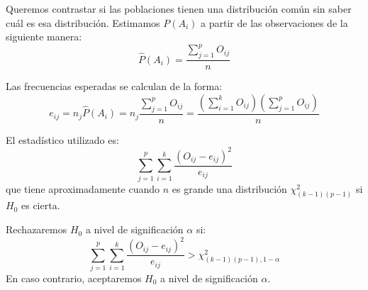 Queremos contrastar si las poblaciones tienen una distribución común sin saber cuál es esa distribución.
Estimamos $P(A_i)$ a partir de las observaciones de la siguiente manera:
$$\hat{P}(A_i) = \frac{\sum_{j=1}^p O_{ij}}{n}$$

Las frecuencias esperadas se calculan de la forma:
$$e_{ij} = n_j\hat{P}(A_i) = n_j \frac{\sum_{j=1}^p O_{ij}}{n} = \frac{(\sum_{i=1}^k O_{ij})(\sum_{j=1}^p O_{ij})}{n}$$

El estadístico utilizado es:
$$\sum_{j=1}^p \sum_{i=1}^k \frac{(O_{ij}-e_{ij})^2}{e_{ij}}$$
que tiene aproximadamente cuando $n$ es grande una distribución $\chi^2_{(k-1)(p-1)}$ si $H_0$ es cierta.

Rechazaremos $H_0$ a nivel de significación $\alpha$ si:
$$\sum_{j=1}^p \sum_{i=1}^k \frac{(O_{ij}-e_{ij})^2}{e_{ij}} > \chi^2_{(k-1)(p-1), 1-\alpha}$$
En caso contrario, aceptaremos $H_0$ a nivel de significación $\alpha$.

